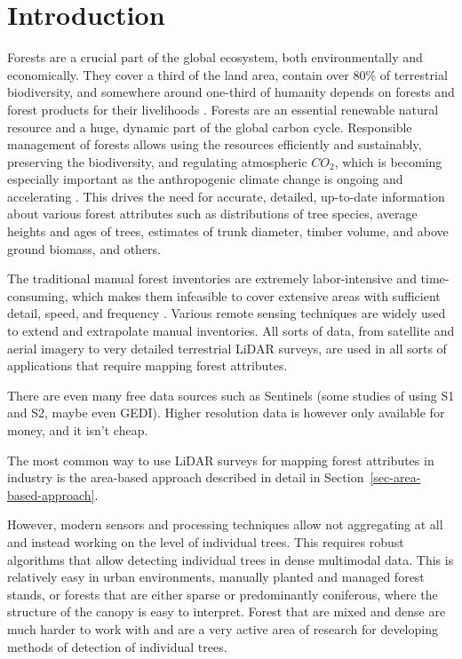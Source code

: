 \chapter{Introduction}\label{cap:introduction}


Forests are a crucial part of the global ecosystem, both environmentally and economically.
They cover a third of the land area, contain over 80\% of terrestrial biodiversity, and somewhere around one-third of humanity depends on forests and forest products for their livelihoods \cite{aertsForestRestorationBiodiversity2011, StateWorldsForests2020}.
Forests are an essential renewable natural resource and a huge, dynamic part of the global carbon cycle.
Responsible management of forests allows using the resources efficiently and sustainably, preserving the biodiversity, and regulating atmospheric $CO_2$, which is becoming especially important as the anthropogenic climate change is ongoing and accelerating \cite{faheyForestCarbonStorage2010, forsterIndicatorsGlobalClimate2024}.
This drives the need for accurate, detailed, up-to-date information about various forest attributes such as distributions of tree species, average heights and ages of trees, estimates of trunk diameter, timber volume, and above ground biomass, and others.

The traditional manual forest inventories are extremely labor-intensive and time-consuming, which makes them infeasible to cover extensive areas with sufficient detail, speed, and frequency \cite{burleyEncyclopediaForestSciences2004}.
Various remote sensing techniques are widely used to extend and extrapolate manual inventories.
All sorts of data, from satellite and aerial imagery to very detailed terrestrial LiDAR surveys, are used in all sorts of applications that require mapping forest attributes.


There are even many free data sources such as Sentinels (some studies of using S1 and S2, maybe even GEDI).
Higher resolution data is however only available for money, and it isn't cheap.

The most common way to use LiDAR surveys for mapping forest attributes in industry is the area-based approach described in detail in Section~\ref{sec-area-based-approach}.

However, modern sensors and processing techniques allow not aggregating at all and instead working on the level of individual trees.
This requires robust algorithms that allow detecting individual trees in dense multimodal data.
This is relatively easy in urban environments, manually planted and managed forest stands, or forests that are either sparse or predominantly coniferous, where the structure of the canopy is easy to interpret.
Forest that are mixed and dense are much harder to work with and are a very active area of research for developing methods of detection of individual trees.

